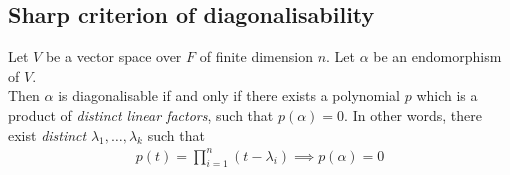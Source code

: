 \subsection{Sharp criterion of diagonalisability}
\begin{theorem}
	Let $V$ be a vector space over $F$ of finite dimension $n$.
	Let $\alpha$ be an endomorphism of $V$. \\
	Then $\alpha$ is diagonalisable if and only if there exists a polynomial $p$ which is a product of \textit{distinct linear factors}, such that $p(\alpha) = 0$.
	In other words, there exist \textit{distinct} $\lambda_1, \dots, \lambda_k$ such that
	\begin{align*}
		p(t) = \prod_{i=1}^n (t - \lambda_i) \implies p(\alpha) = 0
	\end{align*}
\end{theorem}
